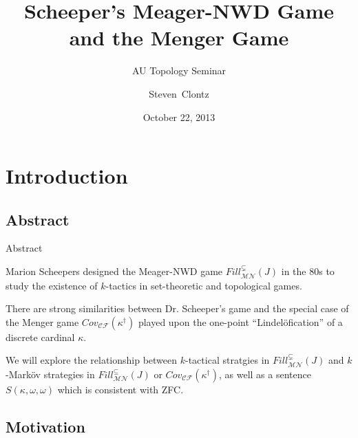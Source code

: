 \documentclass{beamer}
\title
{Scheeper's Meager-NWD Game and the Menger Game}
\subtitle
{AU Topology Seminar} %
\author%
{Steven~Clontz}%
\institute[Auburn University] %
{
  Department of Mathematics and Statistics\\
  Auburn University}
\date[13-10-22] %
{October 22, 2013}
\theoremstyle{theorem}
\theoremstyle{definition}
\newcommand{\oneptlind}[1]{#1^\dagger}
\newcommand{\mengame}[1]{Cov_{\pl C\pl F}(#1)}
\newcommand{\fillgame}[1]{Fill^{\subseteq}_{\pl M\pl N}(#1)}
\newcommand{\sfillgame}[1]{Fill^{\subsetneq}_{\pl M\pl N}(#1)}
\newcommand{\<}{\langle}
\renewcommand{\>}{\rangle}
\newcommand{\pl}[1]{\mathscr{#1}}
\begin{document}
\renewcommand{\pause}{}

\begin{frame}
  \titlepage
\end{frame}




\section{Introduction}

\subsection{Abstract}

\begin{frame}{Abstract}%

    Marion Scheepers designed the Meager-NWD game $\sfillgame{J}$ in the 80s to study the existence of $k$-tactics in set-theoretic and topological games.

    \pause
    \vspace{12pt}

    There are strong similarities between Dr. Scheeper's game and the special case of the Menger game $\mengame{\oneptlind{\kappa}}$ played upon the one-point ``Lindel\"ofication'' of a discrete cardinal $\kappa$.

    \pause
    \vspace{12pt}

    We will explore the relationship between $k$-tactical stratgies in $\sfillgame{J}$ and $k$-Mark\"ov strategies in $\fillgame{J}$ or $\mengame{\oneptlind{\kappa}}$, as well as a sentence $S(\kappa,\omega,\omega)$ which is consistent with ZFC.
\end{frame}

\subsection{Motivation}
\end{document}
